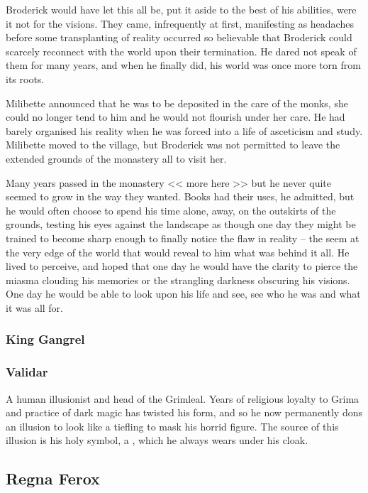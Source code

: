 Broderick would have let this all be, put it aside to the best of his
abilities, were it not for the visions. They came, infrequently at
first, manifesting as headaches before some transplanting of reality
occurred so believable that Broderick could scarcely reconnect with
the world upon their termination. He dared not speak of them for many
years, and when he finally did, his world was once more torn from its
roots.

Milibette announced that he was to be deposited in the care of the
monks, she could no longer tend to him and he would not flourish under
her care. He had barely organised his reality when he was forced into
a life of asceticism and study. Milibette moved to the village, but
Broderick was not permitted to leave the extended grounds of the
monastery all to visit her.

Many years passed in the monastery << more here >> but he never quite
seemed to grow in the way they wanted. Books had their uses, he
admitted, but he would often choose to spend his time alone, away, on
the outskirts of the grounds, testing his eyes against the landscape
as though one day they might be trained to become sharp enough to
finally notice the flaw in reality -- the seem at the very edge of the
world that would reveal to him what was behind it all. He lived to
perceive, and hoped that one day he would have the clarity to pierce
the miasma clouding his memories or the strangling darkness obscuring
his visions. One day he would be able to look upon his life and see,
see who he was and what it was all for.

\subsubsection{King Gangrel}
\label{people:gangrel}

\subsubsection{Validar}
\label{people:validar}
A human illusionist and head of the Grimleal. Years of religious loyalty to Grima and practice of dark magic has twisted his form, and so he now permanently dons an illusion to look like a tiefling to mask his horrid figure. The source of this illusion is his holy symbol, a , which he always wears under his cloak.

\subsection{Regna Ferox}

